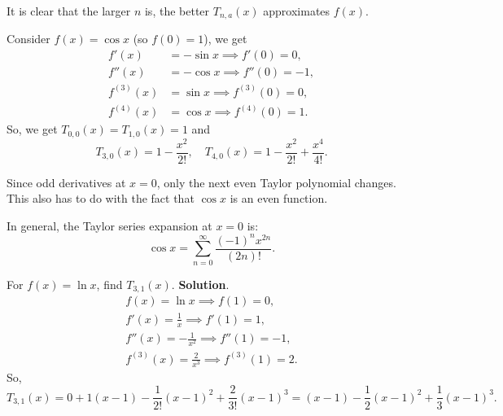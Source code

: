 It is clear that the larger $ n $ is, the better $ T_{n,a}(x) $ approximates $ f(x) $.
\begin{Example}{}{}
    Consider $ f(x)=\cos x $ (so $ f(0)=1 $), we get
    \begin{align*}
        f'(x)      & =-\sin x\implies f'(0)=0,     \\
        f''(x)     & =-\cos x\implies f''(0)=-1,   \\
        f^{(3)}(x) & =\sin x\implies f^{(3)}(0)=0, \\
        f^{(4)}(x) & =\cos x\implies f^{(4)}(0)=1.
    \end{align*}
    So, we get $ T_{0,0}(x)=T_{1,0}(x)=1 $ and
    \[ T_{3,0}(x)=1-\frac{x^2}{2!},\quad T_{4,0}(x)=1-\frac{x^2}{2!}+\frac{x^4}{4!}. \]
    \begin{Remark}{}{}
        Since odd derivatives at $ x=0 $, only the next even Taylor polynomial changes. This also has to do with the fact
        that $ \cos x $ is an even function.
    \end{Remark}
    In general, the Taylor series expansion at $ x=0 $ is:
    \[ \cos x=\sum_{n=0}^{\infty}\frac{(-1)^n x^{2n}}{(2n)!}. \]
\end{Example}
\begin{Example}{}{}
    For $ f(x)=\ln x $, find $ T_{3,1}(x) $.
    \tcblower{}
    \textbf{Solution}.
    \begin{align*}
        f(x)=\ln x\implies f(1)=0,               \\
        f'(x)=\frac{1}{x}\implies f'(1)=1,       \\
        f''(x)=-\frac{1}{x^2}\implies f''(1)=-1, \\
        f^{(3)}(x)=\frac{2}{x^3}\implies f^{(3)}(1)=2.
    \end{align*}
    So,
    \[ T_{3,1}(x)=0+1(x-1)-\frac{1}{2!}(x-1)^2+\frac{2}{3!}(x-1)^3=(x-1)-\frac{1}{2}(x-1)^2+\frac{1}{3}(x-1)^3. \]
\end{Example}
